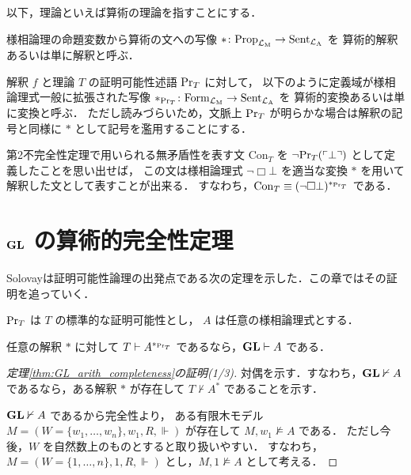 \documentclass{jsarticle}
\begin{document}
\begin{remark}
	以下，理論といえば算術の理論を指すことにする．
\end{remark}

\begin{definition}
	様相論理の命題変数から算術の文への写像 $* \colon \mathrm{Prop}_{\mathcal{L}_\mathrm{M}} \to \mathrm{Sent}_{\mathcal{L}_\mathrm{A}}$ を
	算術的解釈あるいは単に解釈と呼ぶ．
\end{definition}

\begin{definition}
	解釈 $f$ と理論 $T$ の証明可能性述語 $\mathrm{Pr}_T$ に対して，
	以下のように定義域が様相論理式一般に拡張された写像 $*_{\mathrm{Pr}_T} \colon \mathrm{Form}_{\mathcal{L}_\mathrm{M}} \to \mathrm{Sent}_{\mathcal{L}_\mathrm{A}}$ を
	算術的変換あるいは単に変換と呼ぶ．
	ただし読みづらいため，文脈上 $\mathrm{Pr}_T$ が明らかな場合は解釈の記号と同様に $*$ として記号を濫用することにする．
\end{definition}

\begin{example}
	第2不完全性定理で用いられる無矛盾性を表す文 $\mathrm{Con}_T$ を $\lnot \mathrm{Pr}_T(\ulcorner \bot \urcorner)$ として定義したことを思い出せば，
	この文は様相論理式 $\lnot \Box \bot$ を適当な変換 $*$ を用いて解釈した文として表すことが出来る．
	すなわち，$\mathrm{Con}_T \equiv (\lnot \Box \bot)^{*_{\mathrm{Pr}_T}}$ である．
\end{example}



\section{$\mathbf{GL}$ の算術的完全性定理}

Solovay\cite{solovay_provability_1976}は証明可能性論理の出発点である次の定理を示した．この章ではその証明を追っていく．

\begin{theorem}\label{thm:GL_arith_completeness}
	$\mathrm{Pr}_T$ は $T$ の標準的な証明可能性とし，
	$A$ は任意の様相論理式とする．

	任意の解釈 $*$ に対して $T \vdash A^{*_{\mathrm{Pr}_T}}$ であるなら，$\mathbf{GL} \vdash A$ である．
\end{theorem}

\begin{proof}[定理\ref{thm:GL_arith_completeness}の証明(1/3)]
	対偶を示す．すなわち，$\mathbf{GL} \nvdash A$ であるなら，ある解釈 $*$ が存在して $T \nvdash A^*$ であることを示す．

	$\mathbf{GL} \nvdash A$ であるから完全性より，
	ある有限木モデル $M = (W = \{w_1, \dots, w_n\}, w_1, R, \Vdash)$ が存在して $M,w_1 \nvDash A$ である．
	ただし今後，$W$ を自然数上のものとすると取り扱いやすい．
	すなわち，$M = (W = \{1,\dots,n\}, 1, R, \Vdash)$ とし，$M,1 \nvDash A$ として考える．
\end{proof}
\end{document}
